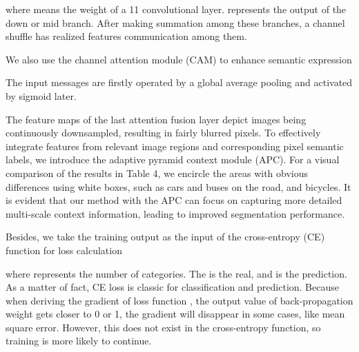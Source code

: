\documentclass[journal,twoside,web]{ieeecolor}
\begin{document}
where  means the weight of a 11 convolutional layer.  represents the output of the down or mid branch. After making summation among these branches, a channel shuffle   has realized features communication among them.


We also use the channel attention module (CAM)  to enhance semantic expression

The input messages  are firstly operated by a global average pooling and activated by sigmoid  later. 


The feature maps of the last attention fusion layer depict images being continuously downsampled, resulting in fairly blurred pixels. To effectively integrate features from relevant image regions and corresponding pixel semantic labels, we introduce the adaptive pyramid context module (APC). For a visual comparison of the results in Table 4, we encircle the areas with obvious differences using white boxes, such as cars and buses on the road, and bicycles. It is evident that our method with the APC can focus on capturing more detailed multi-scale context information, leading to improved segmentation performance. 

Besides, we take the training output as the input of the cross-entropy (CE) function for loss calculation

where  represents the number of categories. The  is the real, and  is the prediction. As a matter of fact, CE loss is classic for classification and prediction. Because when deriving the gradient  of loss function , the output value of back-propagation weight gets closer to 0 or 1, the gradient will disappear in some cases, like mean square error. However, this does not exist in the cross-entropy function, so training is more likely to continue.
\end{document}
